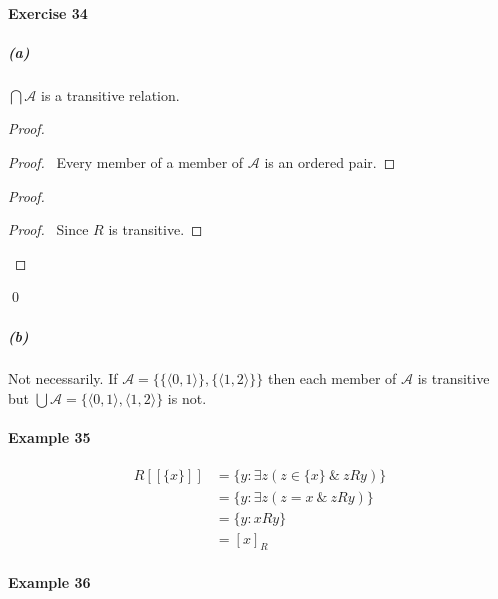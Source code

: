 \documentclass{report}
\begin{document}
    \paragraph{Exercise 34}
    \subparagraph{(a)}
    $\bigcap \mathcal{A}$ is a transitive relation.
    \begin{proof}
        \pf
        \begin{proof}
            \pf\ Every member of a member of $\mathcal{A}$ is an ordered pair.
        \end{proof}
        \begin{proof}
            \begin{proof}
                \pf\ Since $R$ is transitive.
            \end{proof}
        \end{proof}
        \qed
    \end{proof}

    \subparagraph{(b)}
    Not necessarily. If $\mathcal{A} = \{ \{ \langle 0, 1 \rangle \}, \{ \langle 1,2 \rangle \} \}$
    then each member of $\mathcal{A}$ is transitive but $\bigcup \mathcal{A} = \{ \langle 0,1 \rangle,
    \langle 1,2 \rangle \}$ is not.

    \paragraph{Example 35}
    \begin{align*}
        R[\![\{x\}]\!] & = \{ y : \exists z(z \in \{x\} \ \&\ zRy) \} \\
        & = \{y : \exists z(z = x\ \&\ zRy) \} \\
        & = \{y : xRy \} \\
        & = [x]_R
    \end{align*}

    \paragraph{Example 36}
\end{document}

